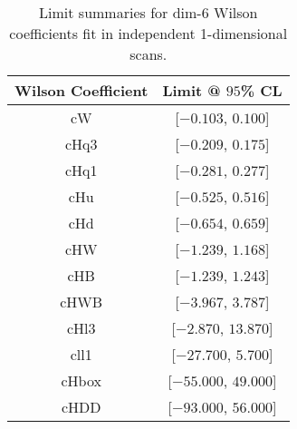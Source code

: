 \begin{table}[!htbp]
    \small
    \center
    \begin{tabular}{c|c}
    Wilson Coefficient & Limit @ $95$\% CL\\
    \hline
    cW & [$-0.103$, $0.100$]\\
    \hline
    cHq3 & [$-0.209$, $0.175$]\\
    \hline
    cHq1 & [$-0.281$, $0.277$]\\
    \hline
    cHu & [$-0.525$, $0.516$]\\
    \hline
    cHd & [$-0.654$, $0.659$]\\
    \hline
    cHW & [$-1.239$, $1.168$]\\
    \hline
    cHB & [$-1.239$, $1.243$]\\
    \hline
    cHWB & [$-3.967$, $3.787$]\\
    \hline
    cHl3 & [$-2.870$, $13.870$]\\
    \hline
    cll1 & [$-27.700$, $5.700$]\\
    \hline
    cHbox & [$-55.000$, $49.000$]\\
    \hline
    cHDD & [$-93.000$, $56.000$]\\
\end{tabular}
    \caption{Limit summaries for dim-6 Wilson coefficients fit in independent 1-dimensional scans.}
    \label{tab:limit_summary_1D}
\end{table}

